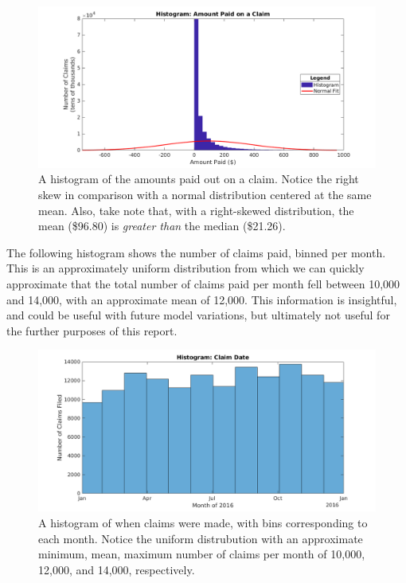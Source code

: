 \documentclass[12pt,letterpaper,titlepage]{article}
\begin{document}
			\begin{figure}[!ht]
			\centering
				\includegraphics[scale=0.4]{hist_amountPaid.png}
				\caption{A histogram of the amounts paid out on a claim. Notice the right skew in comparison with a normal distribution centered at the same mean. Also, take note that, with a right-skewed distribution, the mean (\$96.80) is \emph{greater than} the median (\$21.26).}
				\label{fig:hist_amountPaid}
			\end{figure}
			\FloatBarrier
			
			The following histogram shows the number of claims paid, binned per month. This is an approximately uniform distribution from which we can quickly approximate that the total number of claims paid per month fell between 10,000 and 14,000, with an approximate mean of 12,000. This information is insightful, and could be useful with future model variations, but ultimately not useful for the further purposes of this report.
			
			\begin{figure}[!ht]
			\centering
				\includegraphics[scale=0.4]{hist_claimDate.png}
				\caption{A histogram of when claims were made, with bins corresponding to each month. Notice the uniform distrubution with an approximate minimum, mean, maximum number of claims per month of 10,000, 12,000, and 14,000, respectively.}
				\label{fig:hist_claimDate}
			\end{figure}
			\FloatBarrier
		
\end{document}
